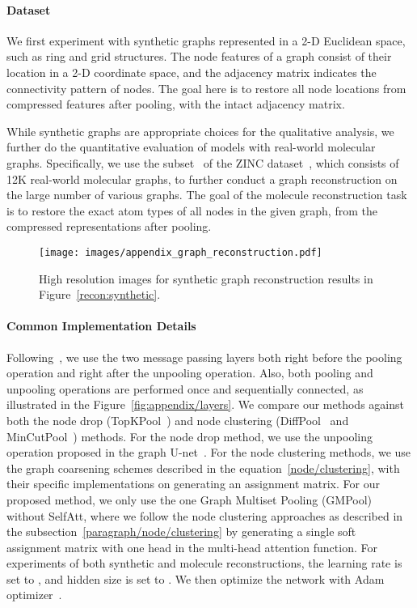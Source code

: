 \paragraph{Dataset}
We first experiment with synthetic graphs represented in a 2-D Euclidean space, such as ring and grid structures. The node features of a graph consist of their location in a 2-D coordinate space, and the adjacency matrix indicates the connectivity pattern of nodes. The goal here is to restore all node locations from compressed features after pooling, with the intact adjacency matrix.

While synthetic graphs are appropriate choices for the qualitative analysis, we further do the quantitative evaluation of models with real-world molecular graphs. Specifically, we use the subset~\citep{benchmarkingGNN} of the ZINC dataset~\citep{ZINC}, which consists of 12K real-world molecular graphs, to further conduct a graph reconstruction on the large number of various graphs. The goal of the molecule reconstruction task is to restore the exact atom types of all nodes in the given graph, from the compressed representations after pooling.

\begin{figure*}[t]
    \centering
    \texttt{[image: images/appendix\_graph\_reconstruction.pdf]}
    \vskip -0.2in
    \caption{High resolution images for synthetic graph reconstruction results in Figure~\ref{recon:synthetic}.}
    \label{fig:appendix/synthetic}
    \vskip -0.15in
\end{figure*}

\paragraph{Common Implementation Details}
Following~\citet{MincutPool}, we use the two message passing layers both right before the pooling operation and right after the unpooling operation. Also, both pooling and unpooling operations are performed once and sequentially connected, as illustrated in the Figure~\ref{fig:appendix/layers}. We compare our methods against both the node drop (TopKPool~\citep{TopKPool}) and node clustering (DiffPool~\citep{DiffPool} and MinCutPool~\citep{MincutPool}) methods. For the node drop method, we use the unpooling operation proposed in the graph U-net~\citep{TopKPool}. For the node clustering methods, we use the graph coarsening schemes described in the equation~\ref{node/clustering}, with their specific implementations on generating an assignment matrix. For our proposed method, we only use the one Graph Multiset Pooling (GMPool) without SelfAtt, where we follow the node clustering approaches as described in the subsection~\ref{paragraph/node/clustering} by generating a single soft assignment matrix with one head  in the multi-head attention function. For experiments of both synthetic and molecule reconstructions, the learning rate is set to , and hidden size is set to . We then optimize the network with Adam optimizer~\citep{kingma2014adam}.


